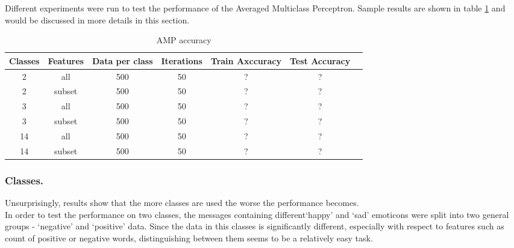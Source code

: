 
\begin{comment}
Experiments / Empirical evaluation (roughly 2-3 pages)
• Any details about experiments (dataset sizes, parameter selection, etc)
• Results
• Analysis (discussion of results / visualization / findings / etc)
\end{comment}

Different experiments were run to test the performance of the Averaged Multiclass Perceptron. Sample results are shown in table \ref{table:AMPaccuracy} and would be discussed in more details in this section.


\begin{table}[h!]
\begin{center}
\begin{tabular}{| c | c | c | c | c | c | c |}
\hline
 {\textbf{Classes}} 			& {\textbf{Features}} 
 & {\textbf{Data per class}} 					& {\textbf{Iterations}} 
 & {\textbf{Train Axccuracy}} 					& {\textbf{Test Accuracy}} 
 \\
\hline
2 			& all 				& 500 		& 50			& ?			& ? 			\\
2 			& subset 		& 500 		& 50			& ?			& ? 			\\
3 			& all 				& 500 		& 50			& ?			& ? 			\\
3 			& subset 		& 500 		& 50			& ?			& ? 			\\
14 		& all		 		& 500 		& 50			& ?			& ? 			\\
14 		& subset 		& 500 		& 50			& ?			& ? 			\\
\hline
\end{tabular}
\caption{AMP accuracy}
\label{table:AMPaccuracy}
\end{center}
\end{table}


\subsubsection*{Classes.} 
Unsurprisingly, results show that the more classes are used the worse the performance becomes. \\

\noindent In order to test the performance on two classes, the messages containing different`happy' and `sad' emoticons were split into two general groups - `negative' and `positive' data. Since the data in this classes is significantly different, especially with respect to features such as count of positive or negative words, distinguishing between them seems to be a relatively easy task. \\

